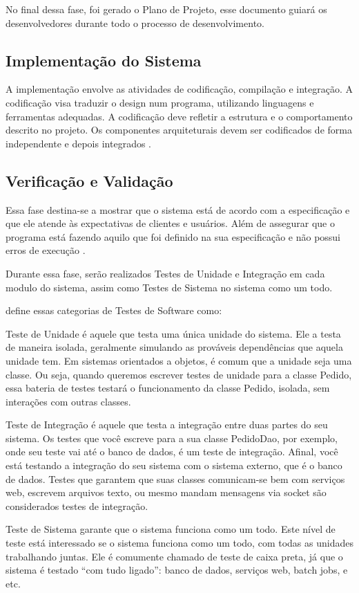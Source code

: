 No final dessa fase, foi gerado o Plano de Projeto, esse documento guiar\'a os desenvolvedores durante 
todo o processo de desenvolvimento.

\subsection{Implementação do Sistema}

A implementação envolve as atividades de codificação, compilação e integração. A codificação visa traduzir o design num programa, utilizando linguagens e  ferramentas adequadas. A codificação deve refletir a estrutura e o comportamento descrito no projeto. Os componentes arquiteturais devem ser codificados de forma independente e depois integrados \cite{aguiar2012requisitos}.

\subsection{Verificação e Validação}
Essa fase destina-se a mostrar que o sistema está de acordo com a especificação 
e que ele atende às expectativas de clientes e usuários. Al\'em de assegurar 
que o  programa está fazendo aquilo que foi definido na sua especificação e não 
possui  erros  de  execução \cite{aguiar2012requisitos}. 

Durante essa fase, ser\~ao realizados Testes de Unidade e Integra\c{c}\~ao em 
cada modulo do sistema, assim como Testes de Sistema no sistema como um todo.

 define essas categorias de Testes de Software como:

\begin{alineascomponto}
	\item Teste de Unidade é aquele que testa uma única unidade do sistema. 
Ele a testa de maneira isolada, geralmente simulando as prováveis dependências 
que aquela unidade tem. Em sistemas orientados a objetos, é comum que a unidade 
seja uma classe. Ou seja, quando queremos escrever testes de unidade para a 
classe Pedido, essa bateria de testes testará o funcionamento da classe Pedido, 
isolada, sem interações com outras classes.

	\item  Teste de Integração é aquele que testa a integração entre duas 
partes do seu sistema. Os testes que você escreve para a sua classe PedidoDao, 
por exemplo, onde seu teste vai até o banco de dados, é um teste de integração. 
Afinal, você está testando a integração do seu sistema com o sistema externo, 
que é o banco de dados. Testes que garantem que suas classes comunicam-se bem 
com serviços web, escrevem arquivos texto, ou mesmo mandam mensagens via socket 
são considerados testes de integração.

	\item Teste de Sistema garante que o sistema funciona como um todo. Este 
nível de teste está interessado se o sistema funciona como um todo, com todas as 
unidades trabalhando juntas. Ele é comumente chamado de teste de caixa preta, já 
que o sistema é testado “com tudo ligado”: banco de dados, serviços web, batch 
jobs, e etc. 
\end{alineascomponto}

